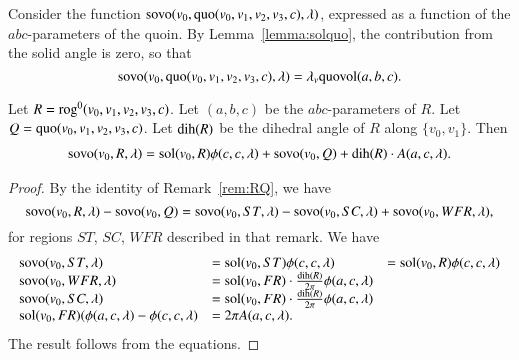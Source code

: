 Consider the function
${\operatorname{sovo}}(v_0,\operatorname{quo}(v_0,v_1,v_2,v_3,c),\lambda)$, expressed
as a function of the $abc$-parameters of the quoin.  By
Lemma~\ref{lemma:solquo}, the contribution from the solid angle
is zero, so that
$$
{\operatorname{sovo}}(v_0,\operatorname{quo}(v_0,v_1,v_2,v_3,c),\lambda) = 
 \lambda_v {\operatorname{quovol}}(a,b,c).
$$


\begin{lemma}  Let $R = {\operatorname{rog}}^0(v_0,
v_1,v_2,v_3,c)$.  Let $(a,b,c)$ be the $abc$-parameters of $R$.
Let $Q=\operatorname{quo}(v_0,v_1,v_2,v_3,c)$.  Let ${\operatorname{dih}}(R)$ be the
dihedral angle of $R$ along $\{v_0,v_1\}$.
Then
  $$
  \begin{array}{lll}
  {\operatorname{sovo}}(v_0,R,\lambda) = \operatorname{sol}(v_0,R)\phi(c,c,\lambda) +
  {\operatorname{sovo}}(v_0,Q) + {\operatorname{dih}}(R)\cdot A(a,c,\lambda).
  \end{array}
  $$
\end{lemma}

\begin{proof}
By the identity of Remark~\ref{rem:RQ}, we have
  $$
  {\operatorname{sovo}}(v_0,R,\lambda) - {\operatorname{sovo}}(v_0,Q) = 
  {\operatorname{sovo}}(v_0,ST,\lambda) - {\operatorname{sovo}}(v_0,SC,\lambda) + 
  {\operatorname{sovo}}(v_0,WFR,\lambda),
  $$
for regions $ST$, $SC$, $WFR$ described in that remark.
We have
  $$
  \begin{array}{lll}
  {\operatorname{sovo}}(v_0,ST,\lambda) &= \operatorname{sol}(v_0,ST)\phi(c,c,\lambda) &= 
  \operatorname{sol}(v_0,R)\phi(c,c,\lambda)\\
  {\operatorname{sovo}}(v_0,WFR,\lambda) &= {\operatorname{sol}}(v_0,FR)\cdot\frac{\operatorname{dih}(R)}{2\pi}
   \phi(a,c,\lambda)\\
  {\operatorname{sovo}}(v_0,SC,\lambda) &= {\operatorname{sol}}(v_0,FR)\cdot\frac{\operatorname{dih}(R)}{2\pi}
   \phi(a,c,\lambda)\\ 
  {\operatorname{sol}}(v_0,FR) (\phi(a,c,\lambda) -\phi(c,c,\lambda) &=
   2\pi A(a,c,\lambda).
  \end{array}
  $$
The result follows from the equations.
\end{proof}



